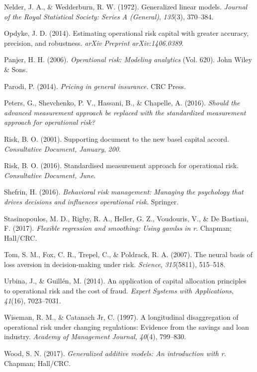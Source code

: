 \documentclass{DissertateUSU}
\begin{document}
\leavevmode\hypertarget{ref-nelder1972generalized}{}%
Nelder, J. A., \& Wedderburn, R. W. (1972). Generalized linear models.
\emph{Journal of the Royal Statistical Society: Series A (General)},
\emph{135}(3), 370--384.

\leavevmode\hypertarget{ref-opdyke2014estimating}{}%
Opdyke, J. D. (2014). Estimating operational risk capital with greater
accuracy, precision, and robustness. \emph{arXiv Preprint
arXiv:1406.0389}.

\leavevmode\hypertarget{ref-panjer2006operational}{}%
Panjer, H. H. (2006). \emph{Operational risk: Modeling analytics} (Vol.
620). John Wiley \& Sons.

\leavevmode\hypertarget{ref-parodi2014pricing}{}%
Parodi, P. (2014). \emph{Pricing in general insurance}. CRC Press.

\leavevmode\hypertarget{ref-peters2016should}{}%
Peters, G., Shevchenko, P. V., Hassani, B., \& Chapelle, A. (2016).
\emph{Should the advanced measurement approach be replaced with the
standardized measurement approach for operational risk?}

\leavevmode\hypertarget{ref-risk2001supporting}{}%
Risk, B. O. (2001). Supporting document to the new basel capital accord.
\emph{Consultative Document, January}, \emph{200}.

\leavevmode\hypertarget{ref-risk2016supporting}{}%
Risk, B. O. (2016). Standardised measurement approach for operational
risk. \emph{Consultative Document, June}.

\leavevmode\hypertarget{ref-shefrin2016behavioral}{}%
Shefrin, H. (2016). \emph{Behavioral risk management: Managing the
psychology that drives decisions and influences operational risk}.
Springer.

\leavevmode\hypertarget{ref-stasinopoulos2017flexible}{}%
Stasinopoulos, M. D., Rigby, R. A., Heller, G. Z., Voudouris, V., \& De
Bastiani, F. (2017). \emph{Flexible regression and smoothing: Using
gamlss in r}. Chapman; Hall/CRC.

\leavevmode\hypertarget{ref-tom2007neural}{}%
Tom, S. M., Fox, C. R., Trepel, C., \& Poldrack, R. A. (2007). The
neural basis of loss aversion in decision-making under risk.
\emph{Science}, \emph{315}(5811), 515--518.

\leavevmode\hypertarget{ref-urbina2014application}{}%
Urbina, J., \& Guillén, M. (2014). An application of capital allocation
principles to operational risk and the cost of fraud. \emph{Expert
Systems with Applications}, \emph{41}(16), 7023--7031.

\leavevmode\hypertarget{ref-wiseman1997longitudinal}{}%
Wiseman, R. M., \& Catanach Jr, C. (1997). A longitudinal disaggregation
of operational risk under changing regulations: Evidence from the
savings and loan industry. \emph{Academy of Management Journal},
\emph{40}(4), 799--830.

\leavevmode\hypertarget{ref-wood2017generalized}{}%
Wood, S. N. (2017). \emph{Generalized additive models: An introduction
with r}. Chapman; Hall/CRC.


\end{document}
